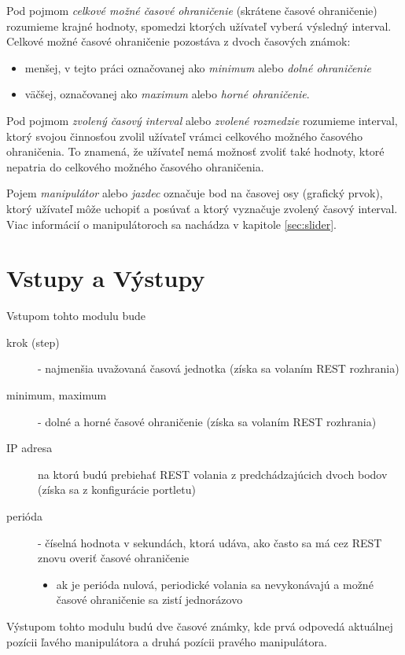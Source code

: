 \documentclass[
  digital, %
  twoside, %
  notable,   %
  nolof,   %
  nolot,   %
]{fithesis3}
\begin{document}
Pod pojmom \textit{celkové možné časové ohraničenie} (skrátene časové ohraničenie) rozumieme krajné hodnoty, spomedzi ktorých užívateľ vyberá výsledný interval. Celkové možné časové ohraničenie pozostáva z dvoch časových známok:
\begin{itemize}
\item menšej, v tejto práci označovanej ako \textit{minimum} alebo \textit{dolné ohraničenie}
\item väčšej, označovanej ako \textit{maximum} alebo \textit{horné ohraničenie}.
\end{itemize}

Pod pojmom \textit{zvolený časový interval} alebo \textit{zvolené rozmedzie} ro\-zu\-mie\-me interval, ktorý svojou činnosťou zvolil užívateľ vrámci celkového možného časového ohraničenia. To znamená, že užívateľ nemá možnosť zvoliť také hodnoty, ktoré nepatria do celkového možného časového ohraničenia.

Pojem \textit{manipulátor} alebo \textit{jazdec} označuje bod na časovej osy (grafický prvok), ktorý užívateľ môže uchopiť a posúvať a ktorý vyznačuje zvolený časový interval. Viac informácií o manipulátoroch sa nachádza v kapitole \ref{sec:slider}.

\section{Vstupy a Výstupy}
Vstupom tohto modulu bude
\begin{description}
\item[krok (step)] - najmenšia uvažovaná časová jednotka (získa sa volaním REST rozhrania)
\item[minimum, maximum] - dolné a horné časové ohraničenie (získa sa volaním REST rozhrania)
\item[IP adresa] na ktorú budú prebiehať REST volania z predchádzajúcich dvoch bodov (získa sa z konfigurácie portletu)
\item[perióda] - číselná hodnota v sekundách, ktorá udáva, ako často sa má cez REST znovu overiť časové ohraničenie
\begin{itemize}
\item ak je perióda nulová, periodické volania sa nevykonávajú a možné časové ohraničenie sa zistí jednorázovo
\end{itemize}
\end{description}
Výstupom tohto modulu budú dve časové známky, kde prvá odpovedá aktuálnej pozícii ľavého manipulátora a druhá pozícii pravého manipulátora.
\end{document}
